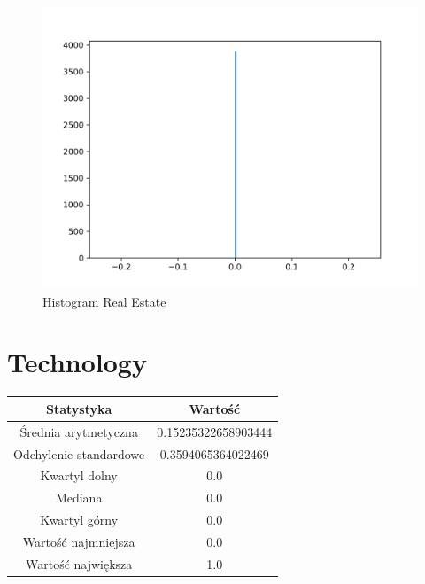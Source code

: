 \documentclass{article}
\begin{document}
\begin{figure}[h!]
    \includegraphics[width=\linewidth]{variables/Real Estate.png}
    \caption{Histogram Real Estate }
\end{figure}\section{ Technology }

\begin{center}
    \begin{tabular}{|c | c|} 
    \hline
    Statystyka & Wartość \\
    \hline\hline
    Średnia arytmetyczna & 0.15235322658903444 \\ 
    \hline
    Odchylenie standardowe & 0.3594065364022469 \\
    \hline
    Kwartyl dolny & 0.0 \\
    \hline
    Mediana & 0.0 \\
    \hline
    Kwartyl górny & 0.0 \\
    \hline
    Wartość najmniejsza & 0.0 \\
    \hline
    Wartość największa & 1.0 \\
    \hline
   \end{tabular}
\end{center}
\end{document}
